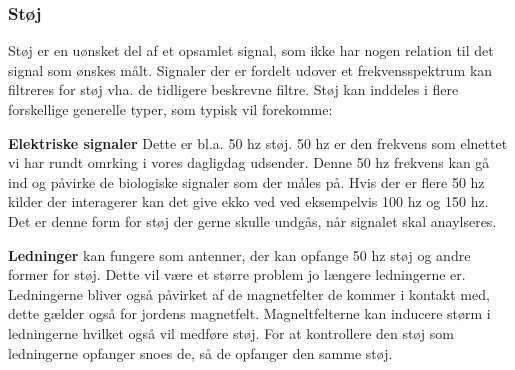 \subsubsection{Støj}
Støj er en uønsket del af et opsamlet signal, som ikke har nogen relation til det signal som ønskes målt. Signaler der er fordelt udover et frekvensspektrum kan filtreres for støj vha. de tidligere beskrevne filtre. \cite{Devasahayam2000}
Støj kan inddeles i flere forskellige generelle typer, som typisk vil forekomme:

\textbf{Elektriske signaler} Dette er bl.a. 50 hz støj. 50 hz er den frekvens som elnettet vi har rundt omrking i vores dagligdag udsender. Denne 50 hz frekvens kan gå ind og påvirke de biologiske signaler som der måles på. Hvis der er flere 50 hz kilder der interagerer kan det give ekko ved ved eksempelvis 100 hz og 150 hz. Det er denne form for støj der gerne skulle undgås, når signalet skal anaylseres.

\textbf{Ledninger} kan fungere som antenner, der kan opfange 50 hz støj og andre former for støj. Dette vil være et større problem jo længere ledningerne er. Ledningerne bliver også påvirket af de magnetfelter de kommer i kontakt med, dette gælder også for jordens magnetfelt. Magneltfelterne kan inducere størm i ledningerne hvilket også vil medføre støj. For at kontrollere den støj som ledningerne opfanger snoes de, så de opfanger den samme støj.


 

% 
 
